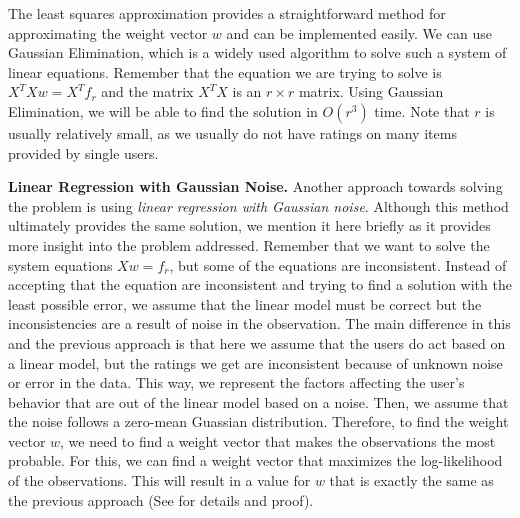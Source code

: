 The least squares approximation provides a straightforward method for approximating the weight vector $w$ and can be implemented easily. We can use Gaussian Elimination, which is a widely used algorithm to solve such a system of linear equations. Remember that the equation we are trying to solve is $X^TXw = X^Tf_r$ and the matrix $X^TX$ is an $r \times r$ matrix. Using Gaussian Elimination, we will be able to find the solution in $O(r^3)$ time. Note that $r$ is usually relatively small, as we usually do not have ratings on many items provided by single users.

\textbf{Linear Regression with Gaussian Noise.}
Another approach towards solving the problem is using \textit{linear regression with Gaussian noise}. Although this method ultimately provides the same solution, we mention it here briefly as it provides more insight into the problem addressed. Remember that we want to solve the system equations $Xw = f_r$, but some of the equations are inconsistent. Instead of accepting that the equation are inconsistent and trying to find a solution with the least possible error, we assume that the linear model must be correct but the inconsistencies are a result of noise in the observation. The main difference in this and the previous approach is that here we assume that the users do act based on a linear model, but the ratings we get are inconsistent because of unknown noise or error in the data. This way, we represent the factors affecting the user's behavior that are out of the linear model based on a noise. Then, we assume that the noise follows a zero-mean Guassian distribution. Therefore, to find the weight vector $w$, we need to find a weight vector that makes the observations the most probable. For this, we can find a weight vector that maximizes the log-likelihood of the observations. This will result in a value for $w$ that is exactly the same as the previous approach (See \cite{ML} for details and proof).

 



